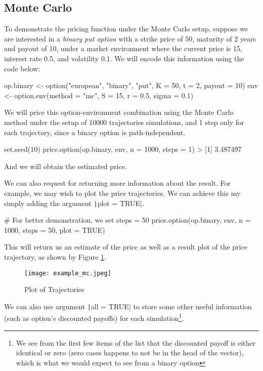 \subsection{Monte Carlo}

To demonstrate the pricing function under the Monte Carlo setup, suppose we are interested in a \textit{binary put option} with a strike price of 50, maturity of 2 years and payout of 10, under a market environment where the current price is 15, interest rate 0.5, and volatility 0.1. We will encode this information using the code below:

\begin{Rminted}
op.binary <- option("european", "binary", "put", K = 50, t = 2, payout = 10)
env <- option.env(method = "mc", S = 15, r = 0.5, sigma = 0.1)
\end{Rminted}

We will price this option-environment combination using the Monte Carlo method under the setup of 10000 trajectories simulations, and 1 step only for each trajectory, since a binary option is path-independent.

\begin{Rminted}
set.seed(10)
price.option(op.binary, env, n = 1000, steps = 1)
> [1] 3.487497
\end{Rminted}

And we will obtain the estimated price.

We can also request for returning more information about the result. For example, we may wish to plot the price trajectories. We can achieve this my simply adding the argument \texttt|plot = TRUE|.

\begin{Rminted}
# For better demonstration, we set steps = 50
price.option(op.binary, env, n = 1000, steps = 50, plot = TRUE)
\end{Rminted}

This will return us an estimate of the price as well as a result plot of the price trajectory, as shown by Figure \ref{img:example_mc}.

\begin{figure}[H]
    \centering
    \texttt{[image: example\_mc.jpeg]}
    \caption{Plot of Trajectories} \label{img:example_mc}
\end{figure}

We can also use argument \texttt|all = TRUE| to store some other useful information (such as option's discounted payoffs) for each simulation\footnote{We see from the first few items of the list that the discounted payoff is either identical or zero (zero cases happens to not be in the head of the vector), which is what we would expect to see from a binary option}.

